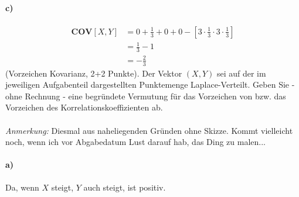 \documentclass[twoside]{article}
\begin{document}
\paragraph{c)}
\begin{align*}
	\textbf{COV}[X,Y]	&=	0+\frac{1}{3}+0+0-\left[ 3 \cdot \frac{1}{3} \cdot 3 \cdot \frac{1}{3} \right]\\
						&=	\frac{1}{3} - 1\\
						&=	-\frac{2}{3}
\end{align*}
(Vorzeichen Kovarianz, 2+2 Punkte).
Der Vektor $(X,Y)$ sei auf der im jeweiligen Aufgabenteil dargestellten Punktemenge Laplace-Verteilt.
Geben Sie - ohne Rechnung - eine begründete Vermutung für das Vorzeichen von  bzw. das Vorzeichen des Korrelationskoeffizienten ab.\\
%						
\vspace{.3cm}\\
\textit{Anmerkung:} Diesmal aus naheliegenden Gründen ohne Skizze. Kommt vielleicht noch, wenn ich vor Abgabedatum Lust darauf hab, das Ding zu malen...\\
\paragraph{a)}Da, wenn $X$ steigt, $Y$ auch steigt, ist  positiv.
\end{document}
